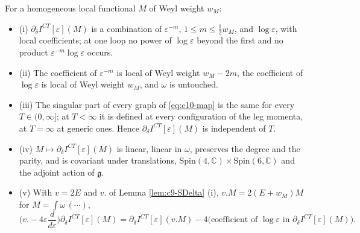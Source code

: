 \begin{proposition}
\label{prop:c10-map}
For a homogeneous local functional $M$ of Weyl weight $w_M$:
\begin{itemize}
\item (i) $\partial_\delta I^{CT}[\varepsilon](M)$ is a combination of $\varepsilon^{-m}$, $1\le m\le\tfrac12w_M$, and $\log\varepsilon$, with local coefficients; at one loop no power of $\log\varepsilon$ beyond the first and no product $\varepsilon^{-m}\log\varepsilon$ occurs.
\item (ii) The coefficient of $\varepsilon^{-m}$ is local of Weyl weight $w_M-2m$, the coefficient of $\log\varepsilon$ is local of Weyl weight $w_M$, and $\omega$ is untouched.
\item (iii) The singular part of every graph of \eqref{eq:c10-map} is the same for every $T\in(0,\infty]$; at $T<\infty$ it is defined at every configuration of the leg momenta, at $T=\infty$ at generic ones. Hence $\partial_\delta I^{CT}[\varepsilon](M)$ is independent of $T$.
\item (iv) $M\mapsto\partial_\delta I^{CT}[\varepsilon](M)$ is linear, linear in $\omega$, preserves the degree and the parity, and is covariant under translations, $\mathrm{Spin}(4,\mathbb C)\times\mathrm{Spin}(6,\mathbb C)$ and the adjoint action of $\mathfrak g$.
\item (v) With $v=2E$ and $v.$ of Lemma \ref{lem:c9-SDelta} (i), $v.M=2(E+w_M)M$ for $M=\int\omega\,(\cdots)$,
\begin{equation}
\Big(v.-4\varepsilon\frac{d}{d\varepsilon}\Big)\partial_\delta I^{CT}[\varepsilon](M)=\partial_\delta I^{CT}[\varepsilon](v.M)-4\big(\text{coefficient of }\log\varepsilon\text{ in }\partial_\delta I^{CT}[\varepsilon](M)\big).
\label{eq:c10-scaling}
\end{equation}
\end{itemize}
\end{proposition}

